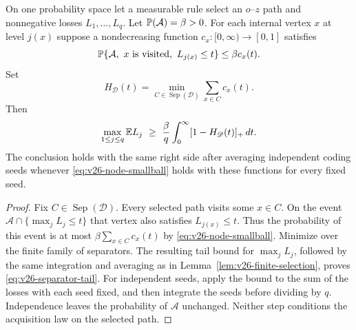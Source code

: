 \begin{theorem}
\label{thm:v26-network-selection}
On one probability space let a measurable rule select an $o$--$z$
path and nonnegative losses $L_1,\ldots,L_q$. Let
$\mathbb P(\mathcal A)=\beta>0$. For each internal vertex $x$ at level
$j(x)$ suppose a nondecreasing function $c_x:[0,\infty)\to[0,1]$
satisfies
\begin{equation}\label{eq:v26-node-smallball}
 \mathbb P\{\mathcal A,\ x\text{ is visited},\ L_{j(x)}\le t\}
                  \le\beta c_x(t).
\end{equation}
Set
\begin{equation}\label{eq:v26-separator-function}
 H_{\mathscr D}(t)=\min_{C\in\operatorname{Sep}(\mathscr D)}
                                  \sum_{x\in C}c_x(t).
\end{equation}
Then
\begin{equation}\label{eq:v26-separator-tail}
 \max_{1\le j\le q}\mathbb E L_j\ \ge\
       \frac{\beta}{q}\int_0^\infty[1-H_{\mathscr D}(t)]_+\,dt.
\end{equation}
The conclusion holds with the same right side after averaging
independent coding seeds whenever \eqref{eq:v26-node-smallball}
holds with these functions for every fixed seed.
\end{theorem}
\begin{proof}
Fix $C\in\operatorname{Sep}(\mathscr D)$. Every selected path visits
some $x\in C$. On the event $\mathcal A\cap\{\max_jL_j\le t\}$
that vertex also satisfies $L_{j(x)}\le t$. Thus the probability of
this event is at most $\beta\sum_{x\in C}c_x(t)$ by
\eqref{eq:v26-node-smallball}. Minimize over the finite family of
separators. The resulting tail bound for $\max_jL_j$, followed by the
same integration and averaging as in Lemma~\ref{lem:v26-finite-selection},
proves \eqref{eq:v26-separator-tail}. For independent seeds, apply the
bound to the sum of the losses with each seed fixed, and then integrate
the seeds before dividing by $q$. Independence leaves the probability
of $\mathcal A$ unchanged. Neither step conditions the acquisition law
on the selected path.
\end{proof}

